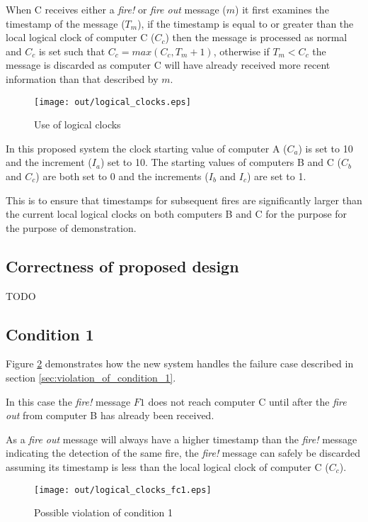 \documentclass[twocolumn]{article}
\begin{document}
When C receives either a \textit{fire!} or \textit{fire out} message ($m$) it
first examines the timestamp of the message ($T_{m}$), if the timestamp is equal
to or greater than the local logical clock of computer C ($C_{c}$) then the
message is processed as normal and $C_{c}$ is set such that $C_{c} = max(C_{c},
T_{m} + 1)$, otherwise if $T_{m} < C_{c}$ the message is discarded as computer C
will have already received more recent information than that described by $m$.

\begin{figure}[h!]
  \centering
  \texttt{[image: out/logical\_clocks.eps]}
  \caption{Use of logical clocks}
  \label{fig:logical_clocks}
\end{figure}

In this proposed system the clock starting value of computer A ($C_{a}$) is set
to 10 and the increment ($I_{a}$) set to 10. The starting values of computers B
and C ($C_{b}$ and $C_{c}$) are both set to 0 and the increments ($I_{b}$ and
$I_{c}$) are set to 1.

This is to ensure that timestamps for subsequent fires are significantly larger
than the current local logical clocks on both computers B and C for the purpose
for the purpose of demonstration.

\subsection{Correctness of proposed design}

TODO

\subsection{Condition 1}

Figure \ref{fig:logical_clocks_fc1} demonstrates how the new system handles the
failure case described in section \ref{sec:violation_of_condition_1}.

In this case the \textit{fire!} message $F1$ does not reach computer C until
after the \textit{fire out} from computer B has already been received.

As a \textit{fire out} message will always have a higher timestamp than the
\textit{fire!} message indicating the detection of the same fire, the
\textit{fire!} message can safely be discarded assuming its timestamp is less
than the local logical clock of computer C ($C_{c}$).

\begin{figure}[h!]
  \centering
  \texttt{[image: out/logical\_clocks\_fc1.eps]}
  \caption{Possible violation of condition 1}
  \label{fig:logical_clocks_fc1}
\end{figure}
\end{document}
